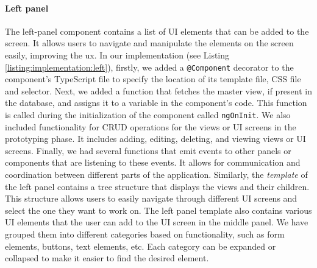 \paragraph{Left panel}
The left-panel component contains a list of UI elements that can be added to the screen.
It allows users to navigate and manipulate the elements on the screen easily, improving the \ac{ux}.
In our implementation (see Listing \ref{listing:implementation:left}), firstly, we added a \texttt{@Component} decorator to the component's TypeScript file to specify the location of its template file, CSS file and selector.
Next, we added a function that fetches the master view, if present in the database, and assigns it to a variable in the component's code. 
This function is called during the initialization of the component called \texttt{ngOnInit}. 
We also included functionality for CRUD operations for the views or UI screens in the prototyping phase. 
It includes adding, editing, deleting, and viewing views or UI screens. 
Finally, we had several functions that emit events to other panels or components that are listening to these events. 
It allows for communication and coordination between different parts of the application.
Similarly, the \textit{template} of the left panel contains a tree structure that displays the views and their children. 
This structure allows users to easily navigate through different UI screens and select the one they want to work on. 
The left panel template also contains various UI elements that the user can add to the UI screen in the middle panel.
We have grouped them into different categories based on functionality, such as form elements, buttons, text elements, etc. 
Each category can be expanded or collapsed to make it easier to find the desired element.

